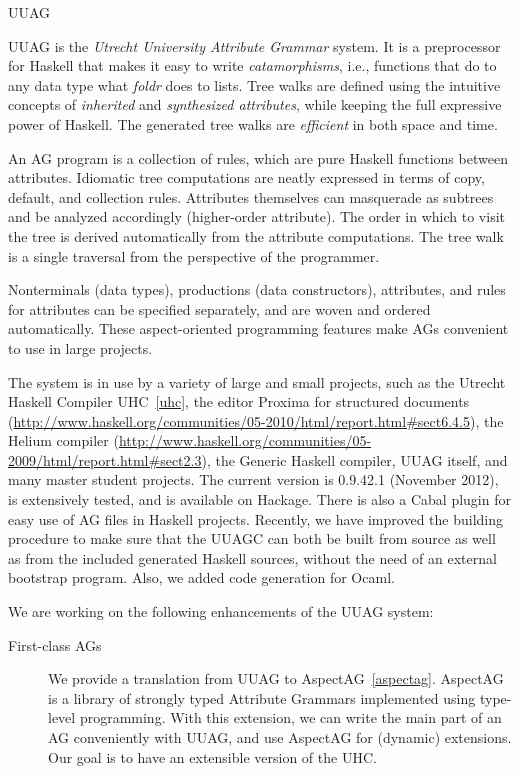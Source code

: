 \begin{hcarentry}[updated]{UUAG}
\label{uuag}
\makeheader

UUAG is the \emph{Utrecht University Attribute Grammar} system. It is a preprocessor for Haskell
that makes it easy to write \emph{catamorphisms}, i.e., functions that do to any data type what
\emph{foldr} does to lists. Tree walks are defined using the intuitive concepts of
\emph{inherited} and \emph{synthesized attributes}, while keeping the full expressive power
of Haskell. The generated tree walks are \emph{efficient} in both space and time.

An AG program is a collection of rules, which are pure Haskell functions between attributes.
Idiomatic tree computations are neatly expressed in terms of copy, default, and collection rules.
Attributes themselves can masquerade as subtrees and be analyzed accordingly (higher-order attribute). The order in which to visit the tree is derived automatically from the attribute computations. The tree walk is a single traversal from the perspective of the programmer.

Nonterminals (data types), productions (data constructors), attributes, and rules for attributes can be specified separately, and are woven and ordered automatically. These aspect-oriented programming features make AGs convenient to use in large projects.

The system is in use by a variety of large and small projects, such as the Utrecht Haskell Compiler UHC~\cref{uhc}, the editor Proxima for structured documents (\url{http://www.haskell.org/communities/05-2010/html/report.html#sect6.4.5}), the Helium compiler (\url{http://www.haskell.org/communities/05-2009/html/report.html#sect2.3}), the Generic Haskell compiler, UUAG itself, and many master student projects.
The current version is 0.9.42.1 (November 2012), is extensively tested, and is available on Hackage. There is also a Cabal plugin for easy use of AG files in Haskell projects.
Recently, we have improved the building procedure to make sure that the UUAGC can both be built from source as well as from the included generated Haskell sources, without the need of an external bootstrap program. Also, we added code generation for Ocaml.

We are working on the following enhancements of the UUAG system:
\begin{description}
\item[First-class AGs]
  We provide a translation from UUAG to AspectAG~\cref{aspectag}.
  AspectAG is a library of strongly typed Attribute Grammars
  implemented using type-level programming. With this extension, we can write the main part of
  an AG conveniently with UUAG, and use AspectAG for (dynamic) extensions. Our goal is to have
  an extensible version of the UHC.


\end{description}
\end{hcarentry}
